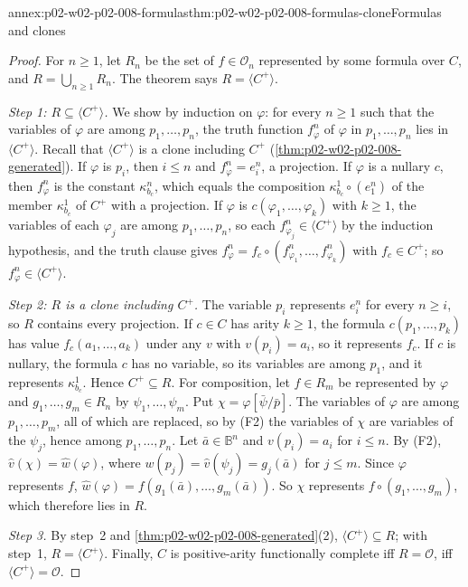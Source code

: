 \begin{annexitem}{annex:p02-w02-p02-008-formulas}{thm:p02-w02-p02-008-formulas-clone}{Formulas and clones}
\begin{proof}
For \(n\geq1\), let \(R_n\) be the set of \(f\in\mathcal O_n\) represented by
some formula over \(C\), and \(R=\bigcup_{n\geq1}R_n\).  The theorem says
\(R=\langle C^+\rangle\).

\emph{Step 1: \(R\subseteq\langle C^+\rangle\).}  We show by induction on
\(\varphi\): for every \(n\geq1\) such that the variables of \(\varphi\) are
among \(p_1,\ldots,p_n\), the truth function \(f^n_\varphi\) of \(\varphi\)
in \(p_1,\ldots,p_n\) lies in \(\langle C^+\rangle\).  Recall that
\(\langle C^+\rangle\) is a clone including \(C^+\)
(\cref{thm:p02-w02-p02-008-generated}).
If \(\varphi\) is \(p_i\), then \(i\leq n\) and \(f^n_\varphi=e^n_i\), a
projection.  If \(\varphi\) is a nullary \(c\), then \(f^n_\varphi\) is the
constant \(\kappa^n_{b_c}\), which equals the composition
\(\kappa^1_{b_c}\circ(e^n_1)\) of the member \(\kappa^1_{b_c}\) of
\(C^+\) with a projection.  If \(\varphi\) is
\(c(\varphi_1,\ldots,\varphi_k)\) with \(k\geq1\), the variables of each
\(\varphi_j\) are among \(p_1,\ldots,p_n\), so each
\(f^n_{\varphi_j}\in\langle C^+\rangle\) by the induction hypothesis, and the
truth clause gives
\(f^n_\varphi=f_c\circ(f^n_{\varphi_1},\ldots,f^n_{\varphi_k})\) with
\(f_c\in C^+\); so \(f^n_\varphi\in\langle C^+\rangle\).

\emph{Step 2: \(R\) is a clone including \(C^+\).}  The variable \(p_i\)
represents \(e^n_i\) for every \(n\geq i\), so \(R\) contains every
projection.  If \(c\in C\) has arity \(k\geq1\), the formula
\(c(p_1,\ldots,p_k)\) has value \(f_c(a_1,\ldots,a_k)\) under any \(v\) with
\(v(p_i)=a_i\), so it represents \(f_c\).  If \(c\) is nullary, the formula
\(c\) has no variable, so its variables are among \(p_1\), and it represents
\(\kappa^1_{b_c}\).  Hence \(C^+\subseteq R\).  For composition, let
\(f\in R_m\) be represented by \(\varphi\) and \(g_1,\ldots,g_m\in R_n\) by
\(\psi_1,\ldots,\psi_m\).  Put \(\chi=\varphi[\bar\psi/\bar p]\).  The
variables of \(\varphi\) are among \(p_1,\ldots,p_m\), all of which are
replaced, so by (F2) the variables of \(\chi\) are variables of the
\(\psi_j\), hence among \(p_1,\ldots,p_n\).  Let \(\bar a\in\mathbb B^n\)
and \(v(p_i)=a_i\) for \(i\leq n\).  By (F2),
\(\widehat v(\chi)=\widehat w(\varphi)\), where
\(w(p_j)=\widehat v(\psi_j)=g_j(\bar a)\) for \(j\leq m\).  Since
\(\varphi\) represents \(f\), \(\widehat w(\varphi)=f(g_1(\bar a),\ldots,
g_m(\bar a))\).  So \(\chi\) represents \(f\circ(g_1,\ldots,g_m)\), which
therefore lies in \(R\).

\emph{Step 3.}  By step~2 and \cref{thm:p02-w02-p02-008-generated}(2),
\(\langle C^+\rangle\subseteq R\); with step~1, \(R=\langle C^+\rangle\).
Finally, \(C\) is positive-arity functionally complete iff
\(R=\mathcal O\), iff \(\langle C^+\rangle=\mathcal O\).
\end{proof}
\end{annexitem}

